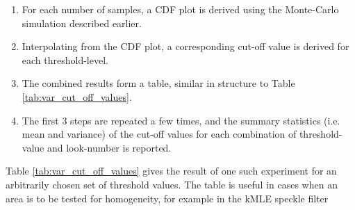 \begin{enumerate}
\item For each number of samples, a CDF plot is derived using the Monte-Carlo simulation described earlier.
  \item Interpolating from the CDF plot, a corresponding cut-off value is derived for each threshold-level.
  \item The combined results form a table, similar in structure to Table \ref{tab:var_cut_off_values}.
  \item The first 3 steps are repeated a few times,
     and the summary statistics (i.e. mean and variance) of the cut-off values for each combination of threshold-value and look-number is reported.  
\end{enumerate}

Table \ref{tab:var_cut_off_values} gives the result of one such experiment for an arbitrarily chosen set of threshold values.
The table is useful in cases when an area is to be tested for homogeneity,
  for example in the kMLE speckle filter \cite{Le_2010_ACRS}

